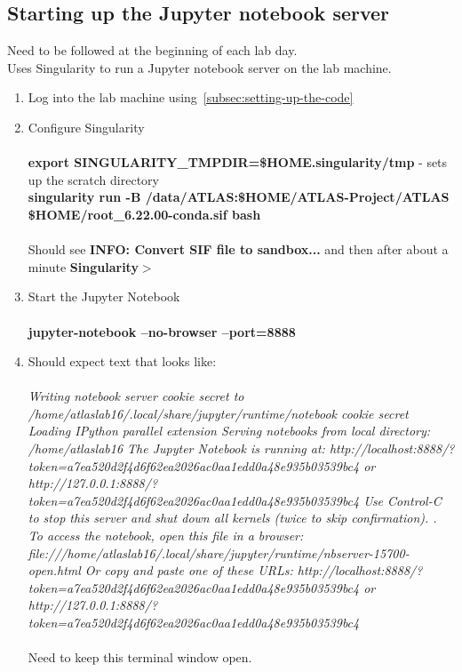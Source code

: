 \documentclass[11pt]{article}
\newcommand{\<}{\guilsinglleft}
\renewcommand{\>}{\guilsinglright}
\begin{document}
    \subsection{Starting up the Jupyter notebook server}
    Need to be followed at the beginning of each lab day.\\
    Uses Singularity to run a Jupyter notebook server on the lab machine.
    \begin{enumerate}
        \item Log into the lab machine using~\ref{subsec:setting-up-the-code}

        \item Configure Singularity
        \\\\
        \textbf{export SINGULARITY\_TMPDIR=\$HOME\/.singularity/tmp} - sets up the scratch directory
        \\
        \textbf{singularity run -B /data/ATLAS:\$HOME/ATLAS-Project/ATLAS \$HOME/root\_6.22.00-conda.sif bash}
        \\\\
        Should see \textbf{INFO: Convert SIF file to sandbox...} and then after about a minute \textbf{Singularity$>$}

        \item Start the Jupyter Notebook
        \\\\
        \textbf{jupyter-notebook --no-browser --port=8888}
        
        \item Should expect text that looks like:
        \\\\
        \textit{Writing notebook server cookie secret to /home/atlaslab16/.local/share/jupyter/runtime/notebook cookie secret
        Loading IPython parallel extension
        Serving notebooks from local directory: /home/atlaslab16
        The Jupyter Notebook is running at: http://localhost:8888/?token=a7ea520d2f4d6f62ea2026ac0aa1edd0a48e935b03539bc4 or http://127.0.0.1:8888/?token=a7ea520d2f4d6f62ea2026ac0aa1edd0a48e935b03539bc4 Use Control-C to stop this server and shut down all kernels (twice to skip confirmation).
        .
        To access the notebook, open this file in a browser: file:///home/atlaslab16/.local/share/jupyter/runtime/nbserver-15700-open.html Or copy and paste one of these URLs: http://localhost:8888/?token=a7ea520d2f4d6f62ea2026ac0aa1edd0a48e935b03539bc4 or http://127.0.0.1:8888/?token=a7ea520d2f4d6f62ea2026ac0aa1edd0a48e935b03539bc4}
        \\\\
        Need to keep this terminal window open.
        

\end{enumerate}
\end{document}

